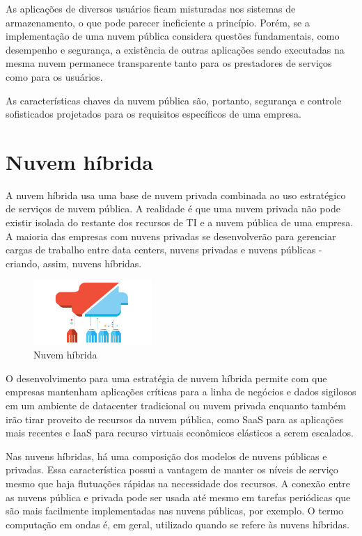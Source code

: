 As aplicações de diversos usuários ficam misturadas nos sistemas de armazenamento,
o que pode parecer ineficiente a princípio. Porém, se a implementação de uma nuvem
pública considera questões fundamentais, como desempenho e segurança, a existência
de outras aplicações sendo executadas na mesma nuvem permanece transparente tanto
para os prestadores de serviços como para os usuários.

As características chaves da nuvem pública são, portanto, segurança e controle
sofisticados projetados para os requisitos específicos de uma empresa.

\section{Nuvem híbrida}

A nuvem híbrida usa uma base de nuvem privada combinada ao uso estratégico de
serviços de nuvem pública. A realidade é que uma nuvem privada não pode existir
isolada do restante dos recursos de TI e a nuvem pública de uma empresa. A maioria
das empresas com nuvens privadas se desenvolverão para gerenciar cargas de trabalho
entre data centers, nuvens privadas e nuvens públicas - criando, assim, nuvens
híbridas.

\begin{figure}[ht]
    \centering
    \includegraphics[width=0.4\textwidth]{img/hybrid.png}
    \caption{Nuvem híbrida}
    \label{img:hybridcloud}
\end{figure}

O desenvolvimento para uma estratégia de nuvem híbrida permite com que empresas
mantenham aplicações críticas para a linha de negócios e dados sigilosos em um
ambiente de datacenter tradicional ou nuvem privada enquanto também irão tirar
proveito de recursos da nuvem pública, como SaaS para as aplicações mais
recentes e IaaS para recurso virtuais econômicos elásticos a serem escalados.

Nas nuvens híbridas, há uma composição dos modelos de nuvens públicas e privadas.
Essa característica possui a vantagem de manter os níveis de serviço mesmo que
haja flutuações rápidas na necessidade dos recursos. A conexão entre as nuvens
pública e privada pode ser usada até mesmo em tarefas periódicas que são mais
facilmente implementadas nas nuvens públicas, por exemplo. O termo computação
em ondas é, em geral, utilizado quando se refere às nuvens híbridas.

